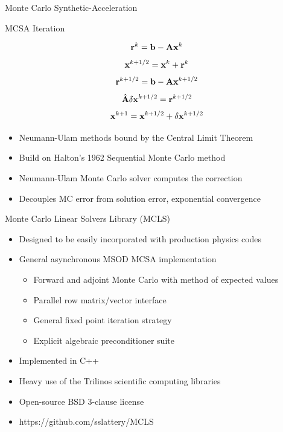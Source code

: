 \documentclass{beamer}
\begin{document}
\begin{frame}{Monte Carlo Synthetic-Acceleration}

  \begin{beamerboxesrounded}[upper=boxheadcolor,lower=boxbodycolor,shadow=true]
    {MCSA Iteration}

    \[
    \mathbf{r}^{k} = \mathbf{b} - \mathbf{A}\mathbf{x}^{k}
    \]
    \[
    \mathbf{x}^{k+1/2} = \mathbf{x}^k + \mathbf{r}^k
    \]
    \[
    \mathbf{r}^{k+1/2} = \mathbf{b} - \mathbf{A}\mathbf{x}^{k+1/2}
    \]
    \[
    \hat{\mathbf{A}}\delta\mathbf{x}^{k+1/2} = \mathbf{r}^{k+1/2}
    \]
    \[
    \mathbf{x}^{k+1} = \mathbf{x}^{k+1/2} + \delta \mathbf{x}^{k+1/2}
    \]

  \end{beamerboxesrounded}

  \medskip \medskip
  \begin{itemize}
  \item Neumann-Ulam methods bound by the Central Limit Theorem
  \item Build on Halton's 1962 Sequential Monte Carlo method
  \item Neumann-Ulam Monte Carlo solver computes the correction
  \item Decouples MC error from solution error, exponential convergence
  \end{itemize}

\end{frame}

\begin{frame}{Monte Carlo Linear Solvers Library (MCLS)}

  \begin{itemize}
  \item Designed to be easily incorporated with production physics
    codes
    \bigskip
  \item General asynchronous MSOD MCSA implementation
    \begin{itemize}
    \item Forward and adjoint Monte Carlo with method of expected
      values
    \item Parallel row matrix/vector interface
    \item General fixed point iteration strategy
    \item Explicit algebraic preconditioner suite
    \end{itemize}
    \medskip
  \item Implemented in C++
    \bigskip
  \item Heavy use of the Trilinos scientific computing libraries
    \bigskip
  \item Open-source BSD 3-clause license
    \bigskip
  \item https://github.com/sslattery/MCLS
  \end{itemize}

\end{frame}
\end{document}

